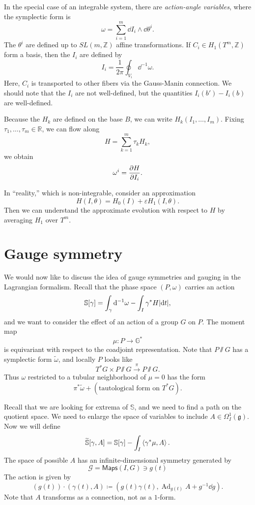\documentclass[leqno, openany]{memoir}
\theoremstyle{definition}
\theoremstyle{remark}
\theoremstyle{plain}
\theoremstyle{definition}
\theoremstyle{remark}
\newcommand{\G}{\mathbb{G}}
\newcommand{\R}{\mathbb{R}}
\newcommand{\Z}{\mathbb{Z}}
\newcommand{\g}{\mathfrak{g}}
\newcommand{\ep}{\varepsilon}
\newcommand{\mc}[1]{\mathcal{#1}}
\newcommand{\ms}[1]{\mathsf{#1}}
\newcommand{\on}[1]{\operatorname{#1}}
\newcommand{\wt}[1]{\widetilde{#1}}
\begin{document}
In the special case of an integrable system, there are \textit{action-angle variables}, where the symplectic form is
\[ \omega = \sum_{i=1}^m \dd{I_i} \wedge \dd{\theta^i}. \]
The $\theta^i$ are defined up to $SL(m, \Z)$ affine transformations. If $C_i \in H_1(T^m, \Z)$ form a basis, then the $I_i$ are defined by
\[ I_i = \frac{1}{2\pi} \oint_{V_i} \dd^{-1} \omega. \]
Here, $C_i$ is transported to other fibers via the Gauss-Manin connection. We should note that the $I_i$ are not well-defined, but the quantities $I_i(b') - I_i(b)$ are well-defined.

Because the $H_k$ are defined on the base $B$, we can write $H_k(I_1, \ldots, I_m)$. Fixing $\tau_1, \ldots, \tau_m \in \R$, we can flow along
\[ H = \sum_{k=1}^m \tau_k H_k, \]
we obtain
\[ \omega^i = \pdv{H}{I_i}. \]

In ``reality,'' which is non-integrable, consider an approximation
\[ H(I,\theta) = H_0(I) + \ep H_1(I, \theta). \]
Then we can understand the approximate evolution with respect to $H$ by averaging $H_1$ over $T^m$.

\section{Gauge symmetry}
\label{sec:gauge}

We would now like to discuss the idea of gauge symmetries and gauging in the Lagrangian formalism. Recall that the phase space $(P, \omega)$ carries an action
\[ \mathbb{S}[\gamma] = \int_{\gamma} \dd^{-1} \omega - \int_I \gamma^* H \abs{\dd{t}}, \]
and we want to consider the effect of an action of a group $G$ on $P$. The moment map
\[ \mu \colon P \to \G^* \]
is equivariant with respect to the coadjoint representation. Note that $P\sslash G$ has a symplectic form $\wt{\omega}$, and locally $P$ looks like
\[ T^* G \times P \sslash G \xrightarrow{\pi} P\sslash G. \]
Thus $\omega$ restricted to a tubular neighborhood of $\mu = 0$ has the form
\[ \pi^* \wt{\omega} + (\text{tautological form on } T^*G). \]

Recall that we are looking for extrema of $\mathbb{S}$, and we need to find a path on the quotient space. We need to enlarge the space of variables to include $A \in \Omega^1_I(\g)$. Now we will define
\[ \wt{\mathbb{S}}[\gamma, A] = \mathbb{S}[\gamma] - \int_I \ev{\gamma^* \mu, A}. \]
The space of possible $A$ has an infinite-dimensional symmetry generated by
\[ \mc{G} = \ms{Maps}(I, G) \ni g(t) \]
The action is given by
\[ (g(t)) \cdot (\gamma(t), A) \coloneqq (g(t) \gamma(t), \on{Ad}_{g(t)}A + g^{-1} \dd{g}). \]
Note that $A$ transforms as a connection, not as a $1$-form.
\end{document}
